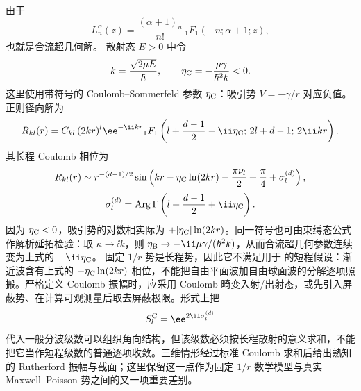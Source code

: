 由于
\begin{equation}
	L_n^\alpha(z)=\frac{(\alpha+1)_n}{n!}\,
	{}_1F_1(-n;\alpha+1;z),
\end{equation}
 也就是合流超几何解。
散射态 \(E>0\) 中令
\begin{equation}
	k=\frac{\sqrt{2\mu E}}{\hbar},\qquad
	\eta_{\rm C}=-\frac{\mu\gamma}{\hbar^2k}<0.
\end{equation}
这里使用带符号的 Coulomb--Sommerfeld 参数 $\eta_{\rm C}$：吸引势 \(V=-\gamma/r\) 对应负值。正则径向解为
\begin{equation}
	R_{kl}(r)=C_{kl}\,(2kr)^l\ee^{-\ii kr}
	{}_1F_1\left(l+\frac{d-1}{2}-\ii\eta_{\rm C};\,2l+d-1;\,2\ii kr\right).
	\label{eq:phys-hdqm-formal-coulomb-scattering-solution}
\end{equation}
其长程 Coulomb 相位为
\begin{equation}
	R_{kl}(r)\sim r^{-(d-1)/2}
	\sin\left(kr-\eta_{\rm C}\ln(2kr)-\frac{\pi\nu_l}{2}
	+\frac{\pi}{4}+\sigma_l^{(d)}\right),
\end{equation}
\begin{equation}
	\sigma_l^{(d)}=\operatorname{Arg}\Gamma\left(l+\frac{d-1}{2}+\ii\eta_{\rm C}\right).
	\label{eq:phys-hdqm-formal-coulomb-phase}
\end{equation}
因为 $\eta_{\rm C}<0$，吸引势的对数相实际为 $+|\eta_{\rm C}|\ln(2kr)$。同一符号也可由束缚态公式作解析延拓检验：取 $\kappa\to\ii k$，则 $\eta_{\rm B}\to-\ii\mu\gamma/(\hbar^2k)$，从而合流超几何参数连续变为上式的 $-\ii\eta_{\rm C}$。
固定 $1/r$ 势是长程势，因此它不满足用于 的短程假设：渐近波含有上式的 $-\eta_{\rm C}\ln(2kr)$ 相位，不能把自由平面波加自由球面波的分解逐项照搬。严格定义 Coulomb 振幅时，应采用 Coulomb 畸变入射/出射态，或先引入屏蔽势、在计算可观测量后取去屏蔽极限。形式上把
\[
S_l^{\rm C}=\ee^{2\ii\sigma_l^{(d)}}
\]
代入一般分波级数可以组织角向结构，但该级数必须按长程散射的意义求和，不能把它当作短程级数的普通逐项收敛。三维情形经过标准 Coulomb 求和后给出熟知的 Rutherford 振幅与截面；这里保留这一点作为固定 $1/r$ 数学模型与真实 Maxwell--Poisson 势之间的又一项重要差别。
